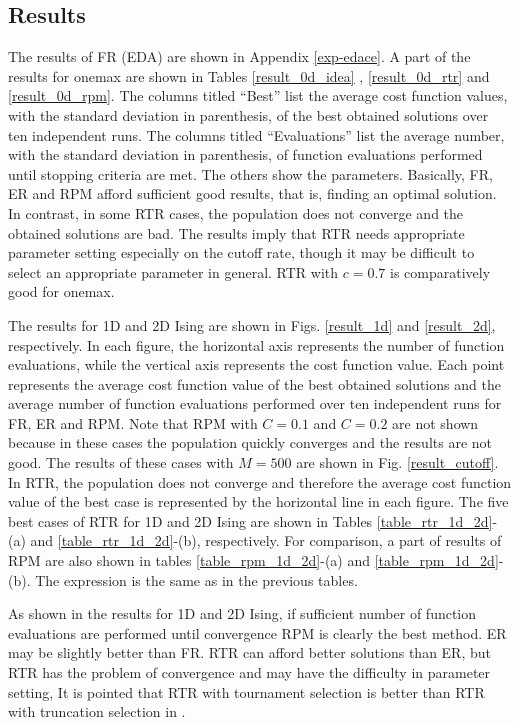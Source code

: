 \subsection{Results}

The results of FR (EDA) are shown in Appendix \ref{exp-edace}.
A part of the results for onemax are shown in Tables \ref{result_0d_idea}
, \ref{result_0d_rtr} and \ref{result_0d_rpm}.
The columns titled ``Best'' list 
the average cost function values, with the standard deviation in parenthesis,
of the best obtained solutions over ten independent runs.
The columns titled ``Evaluations'' 
list the average number, 
with the standard deviation in parenthesis, 
of function evaluations performed  until stopping criteria are met.
The others show the parameters.
Basically, FR, ER and RPM afford sufficient good results,
that is, finding an optimal solution.
In contrast, in some RTR cases,
the population does not converge and
the obtained solutions are bad. 
The results imply that
RTR needs appropriate parameter setting especially on
the cutoff rate, though
it may be difficult to select an appropriate parameter in general.
RTR with $c=0.7$ is comparatively good for onemax.

The results for 1D and 2D Ising are shown in 
Figs. \ref{result_1d} and \ref{result_2d}, respectively.
In each figure,
the horizontal axis represents the number of function evaluations,
while the vertical axis represents the cost function value.
Each point represents the average cost function value of the best obtained
solutions and the average number of function evaluations performed
over ten independent runs for FR, ER and RPM.
Note that RPM with $C=0.1$ and $C=0.2$ are not shown
because in these cases the population quickly converges
and the results are not good.
The results of these cases with $M=500$ are shown in
 Fig. \ref{result_cutoff}.
In RTR, the population does not converge and therefore
the average cost function value of the best case is represented by 
the horizontal line in each figure.
The five best cases of RTR for 1D and 2D Ising are shown in 
Tables \ref{table_rtr_1d_2d}-(a) and \ref{table_rtr_1d_2d}-(b), respectively.
For comparison,
a part of results of RPM are also shown in tables
\ref{table_rpm_1d_2d}-(a) and \ref{table_rpm_1d_2d}-(b).
The expression is the same as in the previous tables. 

As shown in the results for 1D and 2D Ising,
if sufficient number of function evaluations 
are performed until convergence
RPM is clearly the best method.
ER may be slightly better than FR.
RTR can afford better solutions than ER,
but RTR has the problem of convergence
and may have the difficulty in parameter setting,
It is pointed that
RTR with tournament selection is better than
RTR with truncation selection in \cite{lima:replacement}.


